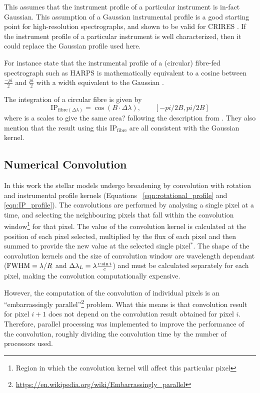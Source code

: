 This assumes that the instrument profile of a particular instrument is in-fact Gaussian. This assumption of a Gaussian instrumental profile is a good starting point for high-resolution spectrographs, and shown to be valid for CRIRES \citep{seifahrt_synthesising_2010}.
If the instrument profile of a particular instrument is well characterized, then it could replace the Gaussian profile used here.

For instance \citet{artigau_optical_2018}  state that the instrumental profile of a (circular) fibre-fed spectrograph such as {HARPS} is mathematically equivalent to a cosine between $\frac{-pi}{2}$ and $\frac{pi}{2}$ with a width equivalent to the Gaussian {\fwhm}.

The integration of a circular fibre is given by
\begin{equation}
\textrm{IP}_{\textrm{fibre}(\Delta\lambda)} = \cos(B\cdot\Delta\lambda) ,  \hspace{2em} [-pi/2B, pi/2B]
\end{equation}
where is a scales to give the same area? 
following the description from \citet{artigau_optical_2018}.  They also mention that the result using this $\textrm{IP}_{\textrm{fibre}}$ are all consistent with the Gaussian kernel.

\subsection{Numerical Convolution}
\label{subsec:numerical_convolution}
In this work the stellar models undergo broadening by convolution with rotation and instrumental profile kernels (Equations ~\ref{eqn:rotational_profile} and \ref{eqn:IP_profile}).
The convolutions are performed by analysing a single pixel at a time, and selecting the neighbouring pixels that fall within the convolution window\footnote{Region in which the convolution kernel will affect this particular pixel} for that pixel.
The value of the convolution kernel is calculated at the position of each pixel selected, multiplied by the flux of each pixel and then summed to provide the new value at the selected single pixel{$^\textbf{*}$}.
 The shape of the convolution kernels and the size of convolution window are wavelength dependant (${\textrm{FWHM}}=\lambda / R$ and $\Delta\lambda_{L}=\lambda \frac{v\sin{i}}{c}$) and must be calculated separately for each pixel, making the convolution computationally expensive.

 However, the computation of the convolution of individual pixels is an ``embarrassingly parallel''\footnote{\href{https://en.wikipedia.org/wiki/Embarrassingly\_parallel}{https://en.wikipedia.org/wiki/Embarrassingly\_parallel}} problem.
 What this means is that convolution result for pixel $i+1$ does not depend on the convolution result obtained for pixel $i$.
 Therefore, parallel processing was implemented to improve the performance of the convolution, roughly dividing the convolution time by the number of processors used.

